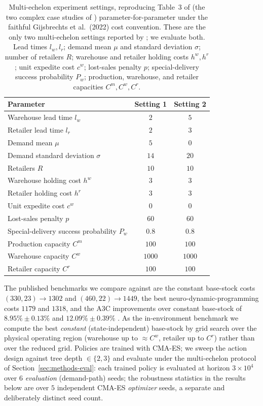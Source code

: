 \documentclass[11pt]{article}
\begin{document}
\begin{table}[!htbp]
\centering
\caption{Multi-echelon experiment settings, reproducing Table~3 of \citet{gijsbrechts2022drl} (the
two complex case studies of \citet{vanroy1997ndp}) parameter-for-parameter under the faithful
Gijsbrechts et al.\ (2022) cost convention. These are the only two multi-echelon settings reported by
\citet{gijsbrechts2022drl}; we evaluate both. Lead times $l_w,l_r$; demand mean $\mu$ and standard
deviation $\sigma$; number of retailers $R$; warehouse and retailer holding costs $h^w,h^r$; unit
expedite cost $c^w$; lost-sales penalty $p$; special-delivery success probability $P_w$; production,
warehouse, and retailer capacities $C^m,C^w,C^r$.}
\label{tab:me-params}
\begin{tabular}{lcc}
\toprule
Parameter & Setting 1 & Setting 2 \\
\midrule
\addlinespace[2pt]
Warehouse lead time $l_w$ & $2$ & $5$ \\
Retailer lead time $l_r$ & $2$ & $3$ \\
Demand mean $\mu$ & $5$ & $0$ \\
Demand standard deviation $\sigma$ & $14$ & $20$ \\
Retailers $R$ & $10$ & $10$ \\
\addlinespace[2pt]
Warehouse holding cost $h^w$ & $3$ & $3$ \\
Retailer holding cost $h^r$ & $3$ & $3$ \\
Unit expedite cost $c^w$ & $0$ & $0$ \\
Lost-sales penalty $p$ & $60$ & $60$ \\
Special-delivery success probability $P_w$ & $0.8$ & $0.8$ \\
\addlinespace[2pt]
Production capacity $C^m$ & $100$ & $100$ \\
Warehouse capacity $C^w$ & $1000$ & $1000$ \\
Retailer capacity $C^r$ & $100$ & $100$ \\
\bottomrule
\end{tabular}
\end{table}
\FloatBarrier

The published benchmarks we compare against are the constant base-stock costs $(330,23)\to 1302$
and $(460,22)\to 1449$, the best neuro-dynamic-programming costs $1179$ and $1318$, and the A3C
improvements over constant base-stock of $8.95\%\pm0.13\%$ and $12.09\%\pm0.39\%$
\citep{vanroy1997ndp, gijsbrechts2022drl}. As the in-environment benchmark we compute the best
\emph{constant} (state-independent) base-stock by grid search over the physical operating region
(warehouse up to $\approx C^w$, retailer up to $C^r$) rather than over the reduced grid. Policies
are trained with CMA-ES; we sweep the action design against tree depth $\in\{2,3\}$ and evaluate
under the multi-echelon protocol of Section~\ref{sec:methods-eval}: each trained policy is evaluated
at horizon $3\times 10^4$ over $6$ \emph{evaluation} (demand-path) seeds; the robustness statistics
in the results below are over $5$ independent CMA-ES \emph{optimizer} seeds, a separate and
deliberately distinct seed count.
\end{document}
